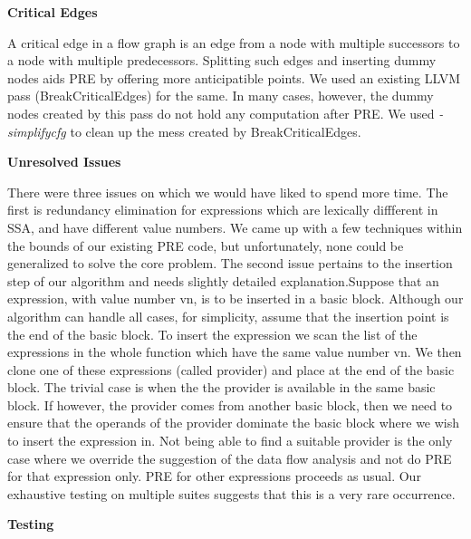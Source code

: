 \documentclass[10pt,twoside]{report}
\begin{document}
\begin{flushleft}
\textbf{\large{Critical Edges}}
\end{flushleft}

A critical edge in a flow graph is an edge from a node with multiple successors to a node with multiple predecessors. Splitting such edges and inserting dummy nodes aids PRE by offering more anticipatible points. We used an existing LLVM pass (BreakCriticalEdges) for the same. In many cases, however, the dummy nodes created by this pass do not hold any computation after PRE. We used \emph{-simplifycfg} to clean up the mess created by BreakCriticalEdges.


\begin{flushleft}
\textbf{\large{Unresolved Issues}}
\end{flushleft}
There were three issues on which we would have liked to spend more time. The first is redundancy 
elimination for expressions which are lexically diffferent in SSA, and have different value numbers. We came
up with a few techniques within the bounds of our existing PRE code, but unfortunately, none could be 
generalized to solve the core problem. The second issue pertains to the insertion step of our algorithm and 
needs slightly detailed explanation.Suppose that an expression, with value number vn, is to be inserted in a 
basic block. Although our algorithm can handle all cases, for simplicity, assume that the
insertion point is the end of the basic block. To insert the expression we
scan the list of the expressions in the whole function which have the same
value number vn.  We then clone one of these expressions (called provider)
  and place at the end of the basic block. The trivial case is when the the
  provider is available in the same basic block. If however, the provider
  comes from another basic block, then we need to ensure that the operands
  of the provider dominate the basic block where we wish to insert the
  expression in. Not being able to find a suitable provider is the only case
  where we override the suggestion of the data flow analysis and not do PRE
  for that expression only. PRE for other expressions proceeds as usual. Our
  exhaustive testing on multiple suites suggests that this is a very rare occurrence. 

\newpage  
\begin{flushleft}
\textbf{\Large{Testing}}
\end{flushleft}
\end{document}
